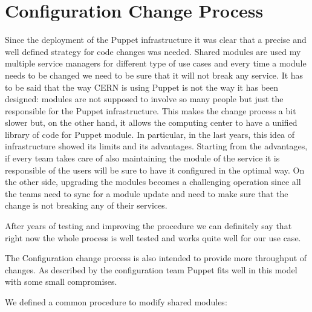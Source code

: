 \section{Configuration Change Process}

Since the deployment of the Puppet infrastructure it was clear that
a precise and well defined strategy for code changes was needed. Shared
modules are used my multiple service managers for different type of use
cases and every time a module needs to be changed we need to be sure that
it will not break any service. It has to be said that the way CERN is
using Puppet is not the way it has been designed: modules are not supposed
to involve so many people but just the responsible for the Puppet
infrastructure. This makes the change process a bit slower but, on the
other hand, it allows the computing center to have a unified library of
code for Puppet module. In particular, in the last years, this idea of
infrastructure showed its limits and its advantages. Starting from the
advantages, if every team takes care of also maintaining the module of the
service it is responsible of the users will be sure to have it configured
in the optimal way. On the other side, upgrading the modules becomes
a challenging operation since all the teams need to sync for a module
update and need to make sure that the change is not breaking any of their
services.

After years of testing and improving the procedure we can definitely say
that right now the whole process is well tested and works quite well for
our use case.

The Configuration change process is also intended to provide more throughput of
changes. As described by the configuration team \cite{benAgile} Puppet fits
well in this model with some small compromises.

We defined a common procedure to modify shared modules:


